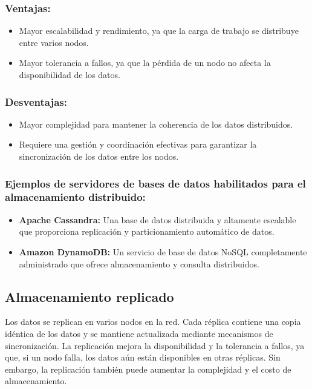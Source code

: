 \subsubsection{Ventajas:}
\begin{itemize}
	\item Mayor escalabilidad y rendimiento, ya que la carga de trabajo se distribuye entre varios nodos.
	\item Mayor tolerancia a fallos, ya que la pérdida de un nodo no afecta la disponibilidad de los datos.
\end{itemize}

\subsubsection{Desventajas:}
\noindent
\begin{itemize}
	\item Mayor complejidad para mantener la coherencia de los datos distribuidos.
	\item Requiere una gestión y coordinación efectivas para garantizar la sincronización de los datos entre los nodos.
\end{itemize}

\subsubsection{Ejemplos de servidores de bases de datos habilitados para el almacenamiento distribuido:}
\noindent
\begin{itemize}
	\item \textbf{Apache Cassandra:} Una base de datos distribuida y altamente escalable que proporciona replicación y particionamiento automático de datos.
	\item \textbf{Amazon DynamoDB:} Un servicio de base de datos NoSQL completamente administrado que ofrece almacenamiento y consulta distribuidos.
\end{itemize}

\subsection{Almacenamiento replicado}
\noindent
Los datos se replican en varios nodos en la red. Cada réplica contiene una copia idéntica de los datos y se mantiene actualizada mediante mecanismos de sincronización. La replicación mejora la disponibilidad y la tolerancia a fallos, ya que, si un nodo falla, los datos aún están disponibles en otras réplicas. Sin embargo, la replicación también puede aumentar la complejidad y el costo de almacenamiento.

